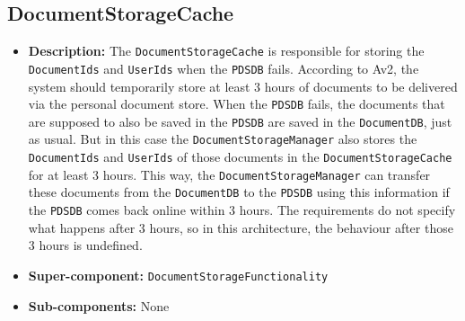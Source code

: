 \documentclass[a4paper,10pt]{article}
\begin{document}
\subsection{DocumentStorageCache}
\begin{itemize}
    \item \textbf{Description:} The \texttt{DocumentStorageCache} is responsible for storing the \texttt{DocumentIds} and \texttt{UserIds} when the \texttt{PDSDB} fails. According to Av2, the system should temporarily store at least 3 hours of documents to be delivered via the personal document store. When the \texttt{PDSDB} fails, the documents that are supposed to also be saved in the \texttt{PDSDB} are saved in the \texttt{DocumentDB}, just as usual. But in this case the \texttt{DocumentStorageManager} also stores the \texttt{DocumentIds} and \texttt{UserIds} of those documents in the \texttt{DocumentStorageCache} for at least 3 hours. This way, the \texttt{DocumentStorageManager} can transfer these documents from the \texttt{DocumentDB} to the \texttt{PDSDB} using this information if the \texttt{PDSDB} comes back online within 3 hours. The requirements do not specify what happens after 3 hours, so in this architecture, the behaviour after those 3 hours is undefined.
    \item \textbf{Super-component:} \texttt{DocumentStorageFunctionality}
    \item \textbf{Sub-components:} None
\end{itemize}
\end{document}
